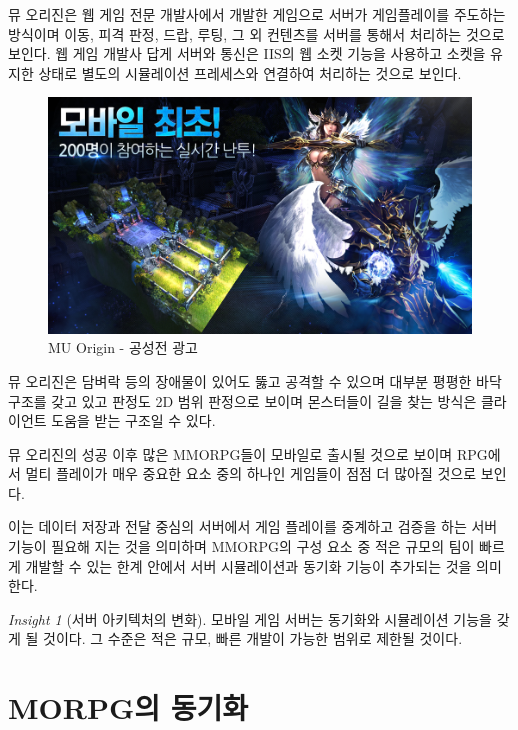 \documentclass[ %
    a4paper,    %
    amsmath,    %
    itemph,     %
]{oblivoir}     %
\theoremstyle{definition}
\theoremstyle{remark}
\newtheorem{insight}{Insight}[section]
\theoremstyle{plain}
\begin{document}
뮤 오리진은 웹 게임 전문 개발사에서 개발한 게임으로 서버가 게임플레이를 주도하는 방식이며
이동, 피격 판정, 드랍, 루팅, 그 외 컨텐츠를 서버를 통해서 처리하는 것으로 보인다.
웹 게임 개발사 답게 서버와 통신은 IIS의 웹 소켓 기능을 사용하고 소켓을 유지한 상태로
별도의 시뮬레이션 프레세스와 연결하여 처리하는 것으로 보인다.

\begin{figure}[h!]
\centering
\includegraphics[scale=0.5]{mu_origin.png}
\caption{MU Origin - 공성전 광고}
\label{fig:mu_origin}
\end{figure}

뮤 오리진은 담벼락 등의 장애물이 있어도 뚫고 공격할 수 있으며 대부분 평평한 바닥 구조를 갖고 있고
판정도 2D 범위 판정으로 보이며 몬스터들이 길을 찾는 방식은 클라이언트 도움을 받는 구조일 수 있다.

뮤 오리진의 성공 이후 많은 MMORPG들이 모바일로 출시될 것으로 보이며
RPG에서 멀티 플레이가 매우 중요한 요소 중의 하나인 게임들이 점점 더 많아질 것으로 보인다.

이는 데이터 저장과 전달 중심의 서버에서 게임 플레이를 중계하고 검증을 하는 서버 기능이
필요해 지는 것을 의미하며 MMORPG의 구성 요소 중 적은 규모의 팀이 빠르게 개발할 수 있는
한계 안에서 서버 시뮬레이션과 동기화 기능이 추가되는 것을 의미한다.

\begin{tcolorbox}[colback=green!5,colframe=green!40!black,title=서버 아키텍처의 변화]
\begin{insight}[서버 아키텍처의 변화]
  모바일 게임 서버는 동기화와 시뮬레이션 기능을 갖게 될 것이다. 그 수준은 적은 규모, 빠른 개발이
  가능한 범위로 제한될 것이다.
\end{insight}
\end{tcolorbox}

\section{MORPG의 동기화}
\end{document}
